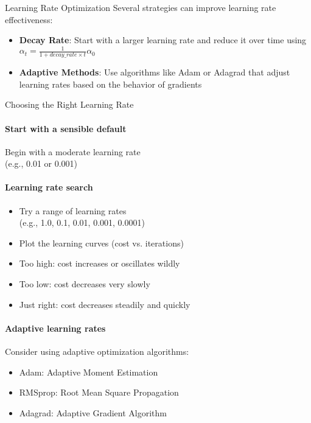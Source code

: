 \begin{concept}{Learning Rate Optimization}
Several strategies can improve learning rate effectiveness:
\begin{itemize}
    \item \textbf{Decay Rate}: Start with a larger learning rate and reduce it over time using $\alpha_t = \frac{1}{1+decay\_rate \times t}\alpha_0$
    \item \textbf{Adaptive Methods}: Use algorithms like Adam or Adagrad that adjust learning rates based on the behavior of gradients
\end{itemize}
\end{concept}


\begin{KR}{Choosing the Right Learning Rate}
\paragraph{Start with a sensible default}
Begin with a moderate learning rate \\(e.g., 0.01 or 0.001)

\paragraph{Learning rate search}
\begin{itemize}
    \item Try a range of learning rates \\(e.g., 1.0, 0.1, 0.01, 0.001, 0.0001)
    \item Plot the learning curves (cost vs. iterations)
    \item Too high: cost increases or oscillates wildly
    \item Too low: cost decreases very slowly
    \item Just right: cost decreases steadily and quickly
\end{itemize}

\paragraph{Adaptive learning rates}
Consider using adaptive optimization algorithms:
\begin{itemize}
    \item Adam: Adaptive Moment Estimation
    \item RMSprop: Root Mean Square Propagation
    \item Adagrad: Adaptive Gradient Algorithm
\end{itemize}


\end{KR}

